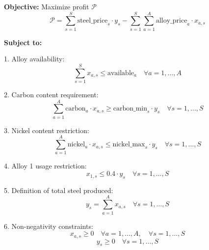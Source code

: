 \documentclass{article}
\begin{document}
\textbf{Objective:} Maximize profit \(\mathcal{P}\) \\
\[
\mathcal{P} = \sum_{s=1}^{S} \text{steel\_price}_s \cdot y_s - \sum_{s=1}^{S} \sum_{a=1}^{A} \text{alloy\_price}_a \cdot x_{a,s}
\]

\textbf{Subject to:}

1. Alloy availability:
\[
\sum_{s=1}^{S} x_{a,s} \leq \text{available}_a \quad \forall a = 1, \ldots, A
\]

2. Carbon content requirement:
\[
\sum_{a=1}^{A} \text{carbon}_a \cdot x_{a,s} \geq \text{carbon\_min}_s \cdot y_s \quad \forall s = 1, \ldots, S
\]

3. Nickel content restriction:
\[
\sum_{a=1}^{A} \text{nickel}_a \cdot x_{a,s} \leq \text{nickel\_max}_s \cdot y_s \quad \forall s = 1, \ldots, S
\]

4. Alloy 1 usage restriction:
\[
x_{1,s} \leq 0.4 \cdot y_s \quad \forall s = 1, \ldots, S
\]

5. Definition of total steel produced:
\[
y_s = \sum_{a=1}^{A} x_{a,s} \quad \forall s = 1, \ldots, S
\]

6. Non-negativity constraints:
\[
x_{a,s} \geq 0 \quad \forall a = 1, \ldots, A, \quad \forall s = 1, \ldots, S
\]
\[
y_s \geq 0 \quad \forall s = 1, \ldots, S
\]
\end{document}

